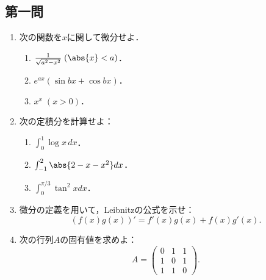 \documentclass[uplatex,dvipdfmx]{jsarticle}
\begin{document}
\subsection{第一問}

\begin{tcolorbox}[colframe=ForestGreen, colback=ForestGreen!10!white,breakable,colbacktitle=ForestGreen!40!white,coltitle=black,fonttitle=\bfseries\sffamily,
    title=第１問]
    \begin{problem}\mbox{}
        \begin{enumerate}[{問}1]
            \item 次の関数を$x$に関して微分せよ．
            \begin{enumerate}
                \item $\frac{1}{\sqrt{a^2-x^2}}\;(\abs{x}<a)$．
                \item $e^{ax}(\sin bx+\cos bx)$．
                \item $x^x\;(x>0)$．
            \end{enumerate}
            \item 次の定積分を計算せよ：
            \begin{enumerate}
                \item $\int^1_0\log x\,dx$．
                \item $\int^2_{-1}\abs{2-x-x^2}dx$．
                \item $\int^{\pi/3}_0\tan^2xdx$．
            \end{enumerate}
            \item 微分の定義を用いて，Leibnitzの公式を示せ：
            \[(f(x)g(x))'=f'(x)g(x)+f(x)g'(x).\]
            \item 次の行列$A$の固有値を求めよ：
            \[A=\begin{pmatrix}
                0&1&1\\
                1&0&1\\
                1&1&0
            \end{pmatrix}.\]
        \end{enumerate}
    \end{problem}
\end{tcolorbox}
\end{document}
